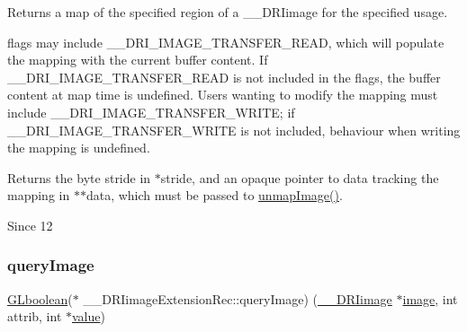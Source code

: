 Returns a map of the specified region of a \+\_\+\+\_\+\+D\+R\+Iimage for the specified usage.

flags may include \+\_\+\+\_\+\+D\+R\+I\+\_\+\+I\+M\+A\+G\+E\+\_\+\+T\+R\+A\+N\+S\+F\+E\+R\+\_\+\+R\+E\+AD, which will populate the mapping with the current buffer content. If \+\_\+\+\_\+\+D\+R\+I\+\_\+\+I\+M\+A\+G\+E\+\_\+\+T\+R\+A\+N\+S\+F\+E\+R\+\_\+\+R\+E\+AD is not included in the flags, the buffer content at map time is undefined. Users wanting to modify the mapping must include \+\_\+\+\_\+\+D\+R\+I\+\_\+\+I\+M\+A\+G\+E\+\_\+\+T\+R\+A\+N\+S\+F\+E\+R\+\_\+\+W\+R\+I\+TE; if \+\_\+\+\_\+\+D\+R\+I\+\_\+\+I\+M\+A\+G\+E\+\_\+\+T\+R\+A\+N\+S\+F\+E\+R\+\_\+\+W\+R\+I\+TE is not included, behaviour when writing the mapping is undefined.

Returns the byte stride in $\ast$stride, and an opaque pointer to data tracking the mapping in $\ast$$\ast$data, which must be passed to \hyperlink{struct_____d_r_iimage_extension_rec_abd0d8c26cfced376ff7b8c31699570cf}{unmap\+Image()}.

\begin{DoxySince}{Since}
12 
\end{DoxySince}
\mbox{\label{struct_____d_r_iimage_extension_rec_a9954149cb12055c40fb7cc9b3a36b47d}} 
\subsubsection{\texorpdfstring{query\+Image}{queryImage}}
{\footnotesize\ttfamily \hyperlink{gl_8h_aea1419aa8aec5854bd9807b45171029d}{G\+Lboolean}($\ast$ \+\_\+\+\_\+\+D\+R\+Iimage\+Extension\+Rec\+::query\+Image) (\hyperlink{dri__interface_8h_a37e0407153595dc88fe5d25127645cf1}{\+\_\+\+\_\+\+D\+R\+Iimage} $\ast$\hyperlink{gl_8h_a0a221b005894579fea3b9eb7bfc2ee71}{image}, int attrib, int $\ast$\hyperlink{glcorearb_8h_a8ad81492d410ff2ac11f754f4042150f}{value})}

\mbox{\label{struct_____d_r_iimage_extension_rec_abd0d8c26cfced376ff7b8c31699570cf}} 
